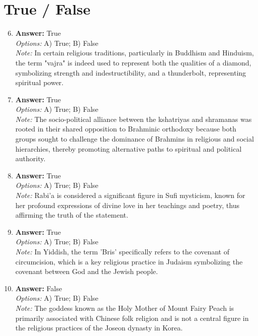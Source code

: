 \documentclass[12pt]{article}
\begin{document}
\section*{True / False}
\begin{enumerate}[label=\arabic*.]
\setcounter{enumi}{5}
\item \textbf{Answer:} True
\\ \textit{Options:} A) True; B) False
\\ \textit{Note:} In certain religious traditions, particularly in Buddhism and Hinduism, the term "vajra" is indeed used to represent both the qualities of a diamond, symbolizing strength and indestructibility, and a thunderbolt, representing spiritual power.
\item \textbf{Answer:} True
\\ \textit{Options:} A) True; B) False
\\ \textit{Note:} The socio-political alliance between the kshatriyas and shramanas was rooted in their shared opposition to Brahminic orthodoxy because both groups sought to challenge the dominance of Brahmins in religious and social hierarchies, thereby promoting alternative paths to spiritual and political authority.
\item \textbf{Answer:} True
\\ \textit{Options:} A) True; B) False
\\ \textit{Note:} Rabi'a is considered a significant figure in Sufi mysticism, known for her profound expressions of divine love in her teachings and poetry, thus affirming the truth of the statement.
\item \textbf{Answer:} True
\\ \textit{Options:} A) True; B) False
\\ \textit{Note:} In Yiddish, the term 'Bris' specifically refers to the covenant of circumcision, which is a key religious practice in Judaism symbolizing the covenant between God and the Jewish people.
\item \textbf{Answer:} False
\\ \textit{Options:} A) True; B) False
\\ \textit{Note:} The goddess known as the Holy Mother of Mount Fairy Peach is primarily associated with Chinese folk religion and is not a central figure in the religious practices of the Joseon dynasty in Korea.
\end{enumerate}
\end{document}
